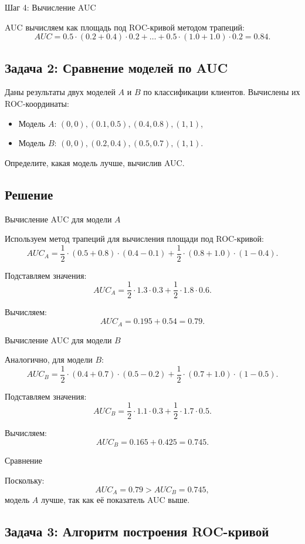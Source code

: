 Шаг 4: Вычисление AUC

AUC вычисляем как площадь под ROC-кривой методом трапеций:
\[
    AUC = 0.5 \cdot (0.2 + 0.4) \cdot 0.2 + \dots + 0.5 \cdot (1.0 + 1.0) \cdot 0.2 = 0.84.
\]

\subsection*{Задача 2: Сравнение моделей по AUC}

Даны результаты двух моделей \(A\) и \(B\) по классификации клиентов. Вычислены их ROC-координаты:

\begin{itemize}
    \item Модель \(A\): \((0, 0), (0.1, 0.5), (0.4, 0.8), (1, 1)\),
    \item Модель \(B\): \((0, 0), (0.2, 0.4), (0.5, 0.7), (1, 1)\).
\end{itemize}

Определите, какая модель лучше, вычислив AUC.

\subsection*{Решение}

Вычисление AUC для модели \(A\)

Используем метод трапеций для вычисления площади под ROC-кривой:
\[
    AUC_A = \frac{1}{2} \cdot (0.5 + 0.8) \cdot (0.4 - 0.1) + \frac{1}{2} \cdot (0.8 + 1.0) \cdot (1 - 0.4).
\]

Подставляем значения:
\[
    AUC_A = \frac{1}{2} \cdot 1.3 \cdot 0.3 + \frac{1}{2} \cdot 1.8 \cdot 0.6.
\]

Вычисляем:
\[
    AUC_A = 0.195 + 0.54 = 0.79.
\]

Вычисление AUC для модели \(B\)

Аналогично, для модели \(B\):
\[
    AUC_B = \frac{1}{2} \cdot (0.4 + 0.7) \cdot (0.5 - 0.2) + \frac{1}{2} \cdot (0.7 + 1.0) \cdot (1 - 0.5).
\]

Подставляем значения:
\[
    AUC_B = \frac{1}{2} \cdot 1.1 \cdot 0.3 + \frac{1}{2} \cdot 1.7 \cdot 0.5.
\]

Вычисляем:
\[
    AUC_B = 0.165 + 0.425 = 0.745.
\]

Сравнение

Поскольку:
\[
    AUC_A = 0.79 > AUC_B = 0.745,
\]
модель \(A\) лучше, так как её показатель AUC выше.

\subsection*{Задача 3: Алгоритм построения ROC-кривой}

